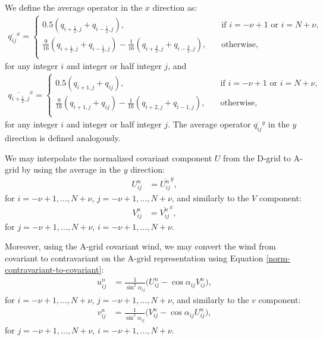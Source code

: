 We define the average operator in the $x$ direction as:
\begin{align}
	\label{av-x}
	\overline{q_{ij}}^x =
	\begin{cases}
	0.5(q_{i+\frac{1}{2},j}+q_{i-\frac{1}{2},j}), 
	\quad &
	\text{if } i=-\nu+1 \text{ or } i=N+\nu,\\
	\frac{9}{16}(q_{i+\frac{1}{2},j}+q_{i-\frac{1}{2},j}) - \frac{1}{16}(q_{i+\frac{3}{2},j}+q_{i-\frac{3}{2},j}), 
	\quad &
	\text{otherwise},\\
\end{cases}
\end{align}
for any integer $i$ and integer or half integer $j$, and
\begin{align}
	\label{av-xx}
	\overline{q_{i+\frac{1}{2},j}}^x =
	\begin{cases}
		0.5(q_{i+1,j}+q_{ij}), 
		\quad &
		\text{if } i=-\nu+1 \text{ or } i=N+\nu,\\
		\frac{9}{16}(q_{i+1,j}+q_{ij}) - \frac{1}{16}(q_{i+2,j}+q_{i-1,j}), 
		\quad &
		\text{otherwise},\\
	\end{cases}
\end{align}
for any integer $i$ and integer or half integer $j$.
The average operator $\overline{q_{ij}}^y$ in the $y$ direction is defined analogously.


We may interpolate the normalized covariant component $U$ from the D-grid to A-grid by using the average in the $y$ direction:
\begin{align}
	\label{d2a-u}
	 U_{ij}^n &= \overline{U_{ij}^n}^y,%
\end{align}
for $i=-\nu+1,\ldots,N+\nu$, $j=-\nu+1,\ldots,N+\nu$, and similarly to the $V$ component:
\begin{align}
	\label{d2a-v}
	V_{ij}^n &=\overline{V_{ij}^n}^x,
\end{align}
for $j=-\nu+1,\ldots,N+\nu$, $i=-\nu+1,\ldots,N+\nu$.

Moreover, using the A-grid covariant wind, we may convert the wind from 
covariant to contravariant on the A-grid representation using Equation \eqref{norm-contravariant-to-covariant}:
\begin{align}
	\label{a-c2c-u}
	u_{ij}^n &= \frac{1}{\sin^2{\alpha}_{ij}}\bigg(U_{ij}^n - \cos{\alpha}_{ij}V_{ij}^n\bigg),
\end{align}
for $i=-\nu+1,\ldots,N+\nu$, $j=-\nu+1,\ldots,N+\nu$, and similarly to the $v$ component:
\begin{align}
	\label{a-c2c-v}
	v_{ij}^n &= \frac{1}{\sin^2{\alpha}_{ij}}\bigg(V_{ij}^n - \cos{\alpha}_{ij}U_{ij}^n\bigg),
\end{align}
for $j=-\nu+1,\ldots,N+\nu$, $i=-\nu+1,\ldots,N+\nu$.


